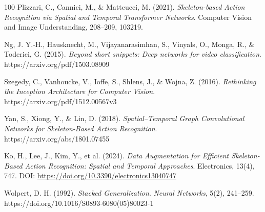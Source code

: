 \documentclass[runningheads]{llncs}
\begin{document}
\begin{thebibliography}{100}
Plizzari, C., Cannici, M., \& Matteucci, M. (2021). 
\textit{Skeleton-based Action Recognition via Spatial and Temporal Transformer Networks}. 
Computer Vision and Image Understanding, 208–209, 103219.

Ng, J. Y.-H., Hausknecht, M., Vijayanarasimhan, S., Vinyals, O., Monga, R., \& Toderici, G. (2015). \textit{Beyond short snippets: Deep networks for video classification}.
https://arxiv.org/pdf/1503.08909

Szegedy, C., Vanhoucke, V., Ioffe, S., Shlens, J., \& Wojna, Z. (2016).
\textit{Rethinking the Inception Architecture for Computer Vision}.
https://arxiv.org/pdf/1512.00567v3

Yan, S., Xiong, Y., \& Lin, D. (2018).
\textit{Spatial–Temporal Graph Convolutional Networks for Skeleton-Based Action Recognition}.
https://arxiv.org/abs/1801.07455

Ko, H., Lee, J., Kim, Y., et al. (2024). 
\textit{Data Augmentation for Efficient Skeleton-Based Action Recognition: Spatial and Temporal Approaches}. 
Electronics, 13(4), 747. 
DOI: \url{https://doi.org/10.3390/electronics13040747}

Wolpert, D. H. (1992). \textit{Stacked Generalization}. \emph{Neural Networks}, 5(2), 241–259. https://doi.org/10.1016/S0893-6080(05)80023-1




\end{thebibliography}
\end{document}
